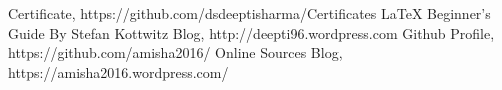 \begin{thebibliography}{9}
\bibitem{} Certificate, https://github.com/dsdeeptisharma/Certificates
\bibitem{} \LaTeX{} Beginner's Guide By Stefan Kottwitz 
\bibitem{} Blog, http://deepti96.wordpress.com
\bibitem{} Github Profile, https://github.com/amisha2016/
\bibitem{} Online Sources
\bibitem{} Blog, https://amisha2016.wordpress.com/
\end{thebibliography}
